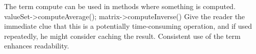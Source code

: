 \recommendation
{The term compute can be used in methods where something is computed.}
{
	valueSet-\textgreater computeAverage();\newline
	matrix-\textgreater computeInverse()
}
{Give the reader the immediate clue that this is a potentially time-consuming operation, and if used repeatedly, he might consider caching the result. Consistent use of the term enhances readability.}